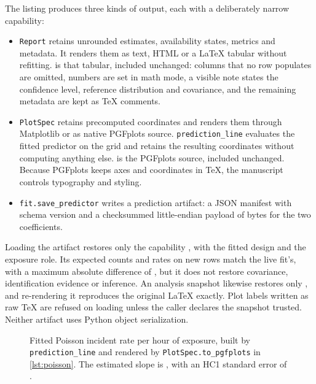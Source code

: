 The listing produces three kinds of output, each with a deliberately narrow
capability:
\begin{itemize}
  \item \texttt{Report} retains unrounded estimates, availability states,
    metrics and metadata. It renders them as text, HTML or a LaTeX tabular
    without refitting.  is that tabular, included unchanged:
    columns that no row populates are omitted, numbers are set in math mode, a
    visible note states the confidence level, reference distribution and
    covariance, and the remaining metadata are kept as TeX comments.
  \item \texttt{PlotSpec} retains precomputed coordinates and renders them
    through Matplotlib or as native PGFplots source.
    \texttt{prediction\_line} evaluates the fitted predictor on the grid and
    retains the resulting coordinates without computing anything else.
     is the PGFplots source, included unchanged. Because
    PGFplots keeps axes and coordinates in TeX, the manuscript controls
    typography and styling.
  \item \texttt{fit.save\_predictor} writes a prediction artifact: a JSON
    manifest with schema version  and a
    checksummed little-endian payload of 
    bytes for the two coefficients.
\end{itemize}

\begin{table}[t]
  \centering
  \small
  \caption{The HC1 inference report of \cref{lst:poisson}, rendered by
  \texttt{Report.to\_latex} and included unchanged.}
  \label{tab:poisson}
  
\end{table}

Loading the artifact restores only the capability
\texttt{}, with the fitted design and the
exposure role. Its expected counts and rates on new rows match the live fit's,
with a maximum absolute difference of ,
but it does not restore covariance, identification evidence or inference. An
analysis snapshot likewise restores only
\texttt{}, and re-rendering it reproduces the
original LaTeX exactly. Plot labels written as raw TeX are refused on loading
unless the caller declares the snapshot trusted. Neither artifact uses Python
object serialization.

\begin{figure}[t]
  \centering
  
  \caption{Fitted Poisson incident rate per hour of exposure, built by
    \texttt{prediction\_line} and rendered by \texttt{PlotSpec.to\_pgfplots}
    in \cref{lst:poisson}. The estimated slope is
    , with an HC1 standard error of
  .}
  \label{fig:rate}
\end{figure}
